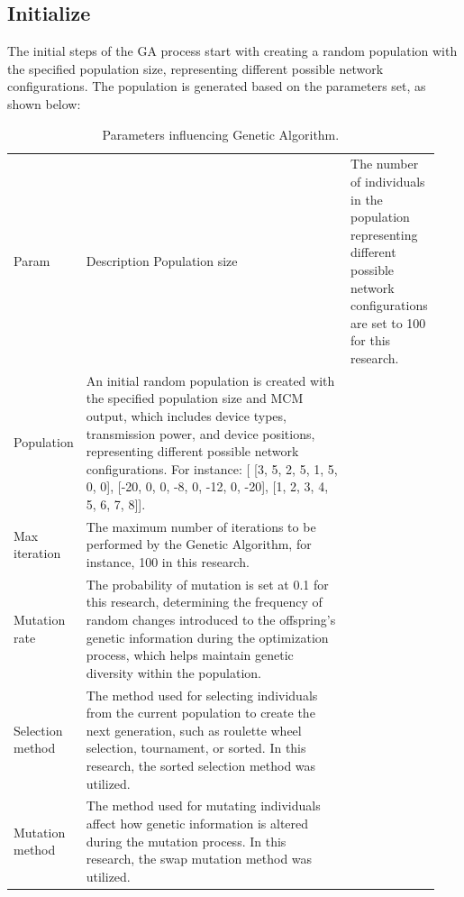 \subsection{Initialize}

The initial steps of the GA process start with creating a random population with the specified population size, representing different possible network configurations. The population is generated based on the parameters set, as shown below:

\begin{longtable}{>{\hspace{0pt}}m{0.077\linewidth}>{\hspace{0pt}}m{0.865\linewidth}}
    \label{tab:ga_parameters}\\
    \caption{Parameters influencing Genetic Algorithm.}\\
    \hline\hline
    Param            & Description \endfirsthead
    \hline
    Population size  & The number of individuals in the population representing different possible network configurations are set to 100 for this research.                                                                                                                                                                                             \\
    Population       & An initial random population is created with the specified population size and MCM output, which includes device types, transmission power, and device positions, representing different possible network configurations. For instance: [ [3, 5, 2, 5, 1, 5, 0, 0], [-20, 0, 0, -8, 0, -12, 0, -20], [1, 2, 3, 4, 5, 6, 7, 8]].  \\
    Max iteration    & The maximum number of iterations to be performed by the Genetic Algorithm, for instance, 100 in this research.                                                                                                                                                                                                                   \\
    Mutation rate    & The probability of mutation is set at 0.1 for this research, determining the frequency of random changes introduced to the offspring's genetic information during the optimization process, which helps maintain genetic diversity within the population.                                                                        \\
    Selection method & The method used for selecting individuals from the current population to create the next generation, such as roulette wheel selection, tournament, or sorted. In this research, the sorted selection method was utilized.                                                                                                        \\
    Mutation method  & The method used for mutating individuals affect how genetic information is altered during the mutation process. In this research, the swap mutation method was utilized.                                                                                                                                                         \\
    \hline\hline
\end{longtable}

